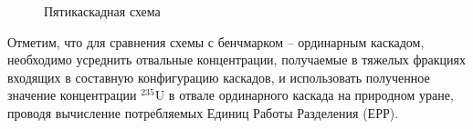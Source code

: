 \begin{figure}[ht]
  \caption{Пятикаскадная схема}\label{fig:Total scheme}
\end{figure}

Отметим, что для сравнения схемы с бенчмарком -- ординарным каскадом, необходимо усреднить отвальные концентрации, получаемые в тяжелых фракциях входящих в составную конфигурацию каскадов, и использовать полученное значение концентрации $^{235}$U в отвале ординарного каскада на природном уране, проводя вычисление потребляемых Единиц Работы Разделения (ЕРР).













